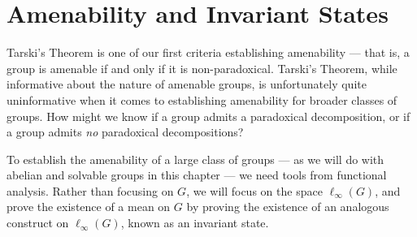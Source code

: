 \documentclass[10pt]{mypackage2}
\begin{document}
\section{Amenability and Invariant States}\label{sec:invariant_states}%
Tarski's Theorem is one of our first criteria establishing amenability --- that is, a group is amenable if and only if it is non-paradoxical. Tarski's Theorem, while informative about the nature of amenable groups, is unfortunately quite uninformative when it comes to establishing amenability for broader classes of groups. How might we know if a group admits a paradoxical decomposition, or if a group admits \textit{no} paradoxical decompositions?\newline

To establish the amenability of a large class of groups --- as we will do with abelian and solvable groups in this chapter --- we need tools from functional analysis. Rather than focusing on $G$, we will focus on the space $\ell_{\infty}(G)$, and prove the existence of a mean on $G$ by proving the existence of an analogous construct on $\ell_{\infty}(G)$, known as an invariant state.
\end{document}
